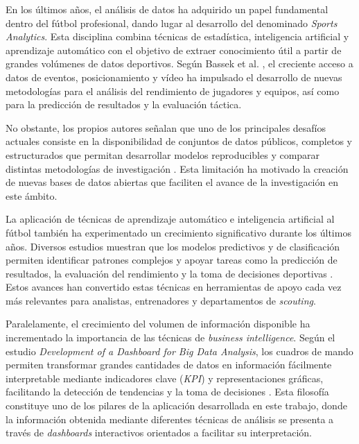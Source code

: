 En los últimos años, el análisis de datos ha adquirido un papel fundamental dentro del fútbol profesional, dando lugar al desarrollo del denominado \textit{Sports Analytics}. Esta disciplina combina técnicas de estadística, inteligencia artificial y aprendizaje automático con el objetivo de extraer conocimiento útil a partir de grandes volúmenes de datos deportivos. Según Bassek et al. \cite{bassek_integrated_2025}, el creciente acceso a datos de eventos, posicionamiento y vídeo ha impulsado el desarrollo de nuevas metodologías para el análisis del rendimiento de jugadores y equipos, así como para la predicción de resultados y la evaluación táctica.

No obstante, los propios autores señalan que uno de los principales desafíos actuales consiste en la disponibilidad de conjuntos de datos públicos, completos y estructurados que permitan desarrollar modelos reproducibles y comparar distintas metodologías de investigación \cite{bassek_integrated_2025}. Esta limitación ha motivado la creación de nuevas bases de datos abiertas que faciliten el avance de la investigación en este ámbito.

La aplicación de técnicas de aprendizaje automático e inteligencia artificial al fútbol también ha experimentado un crecimiento significativo durante los últimos años. Diversos estudios muestran que los modelos predictivos y de clasificación permiten identificar patrones complejos y apoyar tareas como la predicción de resultados, la evaluación del rendimiento y la toma de decisiones deportivas \cite{fotache_machine_2026, rahman_artificial_2026, liu_application_2025}. Estos avances han convertido estas técnicas en herramientas de apoyo cada vez más relevantes para analistas, entrenadores y departamentos de \textit{scouting}.

Paralelamente, el crecimiento del volumen de información disponible ha incrementado la importancia de las técnicas de \textit{business intelligence}. Según el estudio \textit{Development of a Dashboard for Big Data Analysis}, los cuadros de mando permiten transformar grandes cantidades de datos en información fácilmente interpretable mediante indicadores clave (\textit{KPI}) y representaciones gráficas, facilitando la detección de tendencias y la toma de decisiones \cite{marcelo_business_2023}. Esta filosofía constituye uno de los pilares de la aplicación desarrollada en este trabajo, donde la información obtenida mediante diferentes técnicas de análisis se presenta a través de \textit{dashboards} interactivos orientados a facilitar su interpretación.

